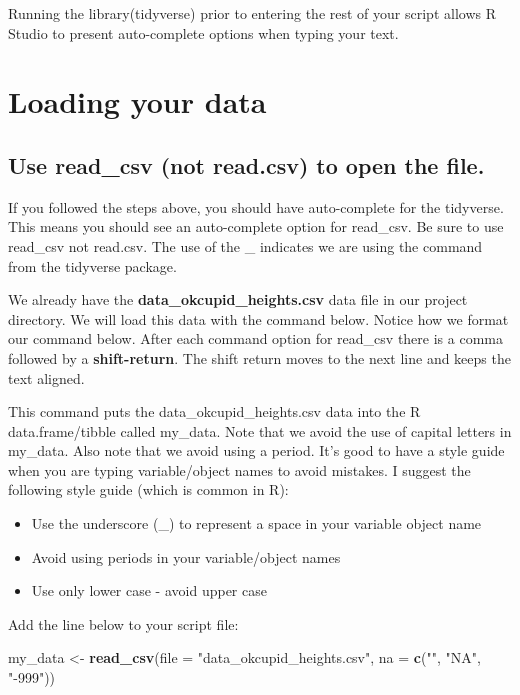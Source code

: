 \documentclass[
]{krantz}
\makeatletter
\newenvironment{Shaded}{\begin{snugshade}}{\end{snugshade}}
\newcommand{\DataTypeTok}[1]{\textcolor[rgb]{0.27,0.27,0.27}{#1}}
\newcommand{\KeywordTok}[1]{\textcolor[rgb]{0.27,0.27,0.27}{\textbf{#1}}}
\newcommand{\NormalTok}[1]{#1}
\newcommand{\StringTok}[1]{\textcolor[rgb]{0.5,0.5,0.5}{#1}}
\providecommand{\tightlist}{%
  \setlength{\itemsep}{0pt}\setlength{\parskip}{0pt}}
\newenvironment{kframe}{%
\medskip{}
\setlength{\fboxsep}{.8em}
 \def\at@end@of@kframe{}%
 \ifinner\ifhmode%
  \def\at@end@of@kframe{\end{minipage}}%
  \begin{minipage}{\columnwidth}%
 \fi\fi%
 \def\FrameCommand##1{\hskip\@totalleftmargin \hskip-\fboxsep
 \colorbox{shadecolor}{##1}\hskip-\fboxsep
     \hskip-\linewidth \hskip-\@totalleftmargin \hskip\columnwidth}%
 \MakeFramed {\advance\hsize-\width
   \@totalleftmargin\z@ \linewidth\hsize
   \@setminipage}}%
 {\par\unskip\endMakeFramed%
 \at@end@of@kframe}
\renewenvironment{Shaded}{\begin{kframe}}{\end{kframe}}
\makeatother
\begin{document}
Running the library(tidyverse) prior to entering the rest of your script allows R Studio to present auto-complete options when typing your text.

\hypertarget{loading-your-data}{%
\section{Loading your data}\label{loading-your-data}}

\hypertarget{use-read_csv-not-read.csv-to-open-the-file.}{%
\subsection{Use read\_csv (not read.csv) to open the file.}\label{use-read_csv-not-read.csv-to-open-the-file.}}

If you followed the steps above, you should have auto-complete for the tidyverse. This means you should see an auto-complete option for read\_csv. Be sure to use read\_csv not read.csv. The use of the \_ indicates we are using the command from the tidyverse package.

We already have the \textbf{data\_okcupid\_heights.csv} data file in our project directory. We will load this data with the command below. Notice how we format our command below. After each command option for read\_csv there is a comma followed by a \textbf{shift-return}. The shift return moves to the next line and keeps the text aligned.

This command puts the data\_okcupid\_heights.csv data into the R data.frame/tibble called my\_data. Note that we avoid the use of capital letters in my\_data. Also note that we avoid using a period. It's good to have a style guide when you are typing variable/object names to avoid mistakes. I suggest the following style guide (which is common in R):

\begin{itemize}
\tightlist
\item
  Use the underscore (\_) to represent a space in your variable object name
\item
  Avoid using periods in your variable/object names
\item
  Use only lower case - avoid upper case
\end{itemize}

Add the line below to your script file:

\begin{Shaded}
\begin{Highlighting}[]
\NormalTok{my_data <-}\StringTok{ }\KeywordTok{read_csv}\NormalTok{(}\DataTypeTok{file =} \StringTok{"data_okcupid_heights.csv"}\NormalTok{, }
                    \DataTypeTok{na =} \KeywordTok{c}\NormalTok{(}\StringTok{""}\NormalTok{, }\StringTok{"NA"}\NormalTok{, }\StringTok{"-999"}\NormalTok{))}
\end{Highlighting}
\end{Shaded}
\end{document}
